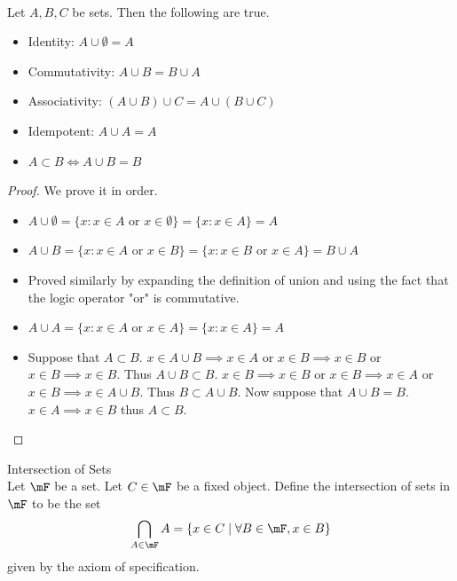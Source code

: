 \documentclass[a4paper]{article}
\begin{document}
\begin{prp}{}{}\\
Let $A,B,C$ be sets. Then the following are true. 
\begin{itemize}
\item Identity: $A\cup\emptyset=A$
\item Commutativity: $A\cup B=B\cup A$
\item Associativity: $(A\cup B)\cup C=A\cup(B\cup C)$
\item Idempotent: $A\cup A=A$
\item $A\subset B\iff A\cup B=B$
\end{itemize}
\begin{proof} We prove it in order. 
\begin{itemize}
\item $A\cup\emptyset=\{x:x\in A\text{ or }x\in\emptyset\}=\{x:x\in A\}=A$
\item $A\cup B=\{x:x\in A\text{ or }x\in B\}=\{x:x\in B\text{ or }x\in A\}=B\cup A$
\item Proved similarly by expanding the definition of union and using the fact that the logic operator "or" is commutative. 
\item $A\cup A=\{x:x\in A\text{ or }x\in A\}=\{x:x\in A\}=A$
\item Suppose that $A\subset B$. $x\in A\cup B\implies x\in A$ or $x\in B\implies x\in B$ or $x\in B\implies x\in B$. Thus $A\cup B\subset B$. $x\in B\implies x\in B$ or $x\in B\implies x\in A$ or $x\in B\implies x\in A\cup B$. Thus $B\subset A\cup B$. Now suppose that $A\cup B=B$. $x\in A\implies x\in B$ thus $A\subset B$. 
\end{itemize}
\end{proof}
\end{prp}

\begin{defn}{Intersection of Sets}{}\\
Let $\mF$ be a set. Let $C\in\mF$ be a fixed object. Define the intersection of sets in $\mF$ to be the set $$\bigcap_{A\in\mF}A=\{x\in C\;|\;\forall B\in\mF, x\in B\}$$ given by the axiom of specification. 
\end{defn}
\end{document}
